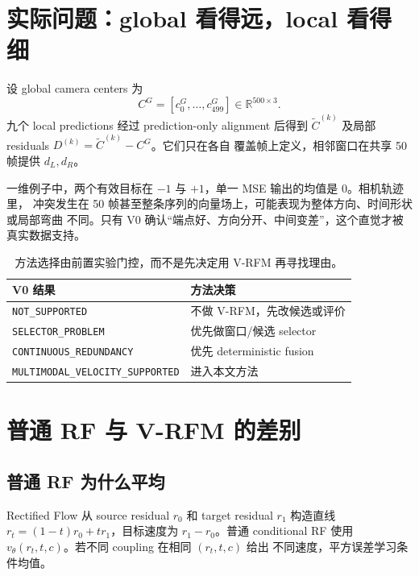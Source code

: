 \documentclass[UTF8,a4paper,11pt]{ctexart}
\begin{document}
\section{实际问题：global 看得远，local 看得细}

设 global camera centers 为
\begin{equation}
  C^G=[c_0^G,\ldots,c_{499}^G]\in\mathbb R^{500\times3}.
\end{equation}
九个 local predictions 经过 prediction-only alignment 后得到
$\widetilde C^{(k)}$ 及局部 residuals $D^{(k)}=\widetilde C^{(k)}-C^G$。它们只在各自
覆盖帧上定义，相邻窗口在共享 50 帧提供 $d_L,d_R$。

一维例子中，两个有效目标在 $-1$ 与 $+1$，单一 MSE 输出的均值是 0。相机轨迹里，
冲突发生在 50 帧甚至整条序列的向量场上，可能表现为整体方向、时间形状或局部弯曲
不同。只有 V0 确认“端点好、方向分开、中间变差”，这个直觉才被真实数据支持。

\begin{table}[htbp]
  \centering
  \small
  \begin{tabularx}{\textwidth}{>{\raggedright\arraybackslash}p{4.3cm}X}
    \toprule
    V0 结果 & 方法决策 \\
    \midrule
    \texttt{NOT\_SUPPORTED} & 不做 V-RFM，先改候选或评价 \\
    \texttt{SELECTOR\_PROBLEM} & 优先做窗口/候选 selector \\
    \texttt{CONTINUOUS\_REDUNDANCY} & 优先 deterministic fusion \\
    \texttt{MULTIMODAL\_}\newline\texttt{VELOCITY\_SUPPORTED} & 进入本文方法 \\
    \bottomrule
  \end{tabularx}
  \caption{方法选择由前置实验门控，而不是先决定用 V-RFM 再寻找理由。}
\end{table}

\section{普通 RF 与 V-RFM 的差别}

\subsection{普通 RF 为什么平均}

Rectified Flow 从 source residual $r_0$ 和 target residual $r_1$ 构造直线
$r_t=(1-t)r_0+t r_1$，目标速度为 $r_1-r_0$\citep{liu2023flowstraight}。普通
conditional RF 使用 $v_\theta(r_t,t,c)$。若不同 coupling 在相同 $(r_t,t,c)$ 给出
不同速度，平方误差学习条件均值\citep{lipman2023flow}。
\end{document}
